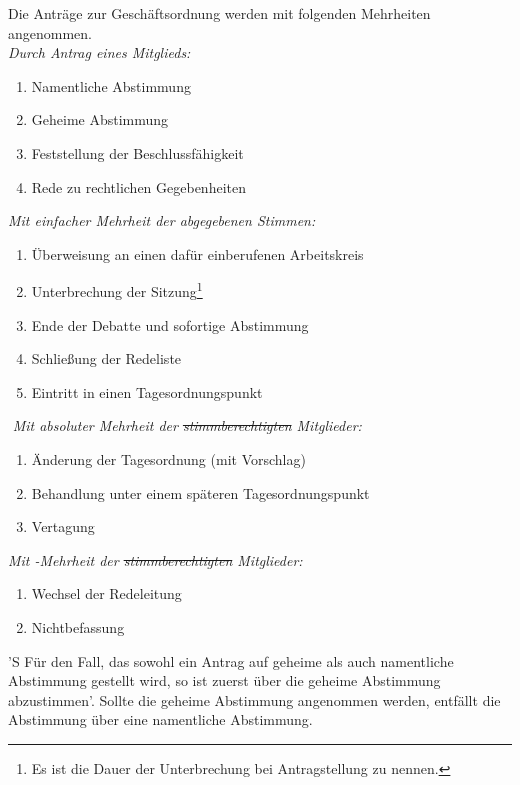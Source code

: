 \documentclass[%
	parskip=half,
]{scrartcl}
\newcounter{enumitem}
\newcommand{\edit}[1]{{\color{red} #1}}
\newcommand{\add}[1]{{\color{blue} #1}}
\newcommand{\delete}[1]{{\color{red} \sout{#1}}}
\begin{document}
\begin{contract}
Die Anträge zur Geschäftsordnung werden mit folgenden Mehrheiten angenommen. \\
\newline
\textit{Durch Antrag eines Mitglieds:}
\begin{enumerate}[\qquad a)]
	\item Namentliche Abstimmung
	\item Geheime Abstimmung
	\item Feststellung der Beschlussfähigkeit
	\item Rede zu rechtlichen Gegebenheiten
	\setcounter{enumitem}{\value{enumi}}
\end{enumerate}
\textit{Mit einfacher Mehrheit der abgegebenen Stimmen:}
\begin{enumerate}[\qquad a)]
	\setcounter{enumi}{\value{enumitem}}
	\item Überweisung \edit{an einen dafür einberufenen Arbeitskreis}
	\item Unterbrechung der Sitzung\footnote{\add{Es ist die Dauer der Unterbrechung bei Antragstellung zu nennen.}}
	\item Ende der Debatte und sofortige Abstimmung
	\item \edit{Schließung der Redeliste}
	\item Eintritt in einen Tagesordnungspunkt
	\setcounter{enumitem}{\value{enumi}}
\end{enumerate}​
\textit{Mit absoluter Mehrheit der \delete{stimmberechtigten} Mitglieder:}
\begin{enumerate}[\qquad a)]
	\setcounter{enumi}{\value{enumitem}}
	\item Änderung der Tagesordnung (mit Vorschlag)
	\item Behandlung unter einem späteren Tagesordnungspunkt
	\item Vertagung
	\setcounter{enumitem}{\value{enumi}}
\end{enumerate}
\textit{Mit -Mehrheit der \delete{stimmberechtigten} Mitglieder:}
\begin{enumerate}[\qquad a)]
	\setcounter{enumi}{\value{enumitem}}
	\item Wechsel der \edit{Redeleitung}
	\item Nichtbefassung
\end{enumerate}

'S Für den Fall, das sowohl ein Antrag auf geheime als auch namentliche Abstimmung gestellt wird, \edit{so ist} zuerst 
über die geheime Abstimmung \edit{abzustimmen}'. Sollte die geheime Abstimmung angenommen werden, entfällt \edit{die} 
Abstimmung über eine namentliche Abstimmung.


\end{contract}
\end{document}
